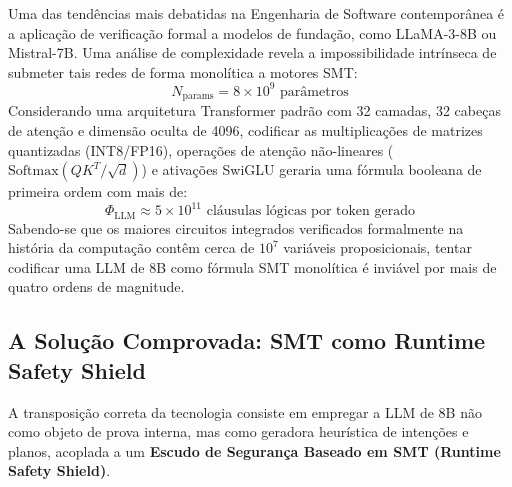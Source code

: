 \documentclass[11pt,a4paper]{article}
\theoremstyle{definition}
\begin{document}
Uma das tendências mais debatidas na Engenharia de Software contemporânea é a aplicação de verificação formal a modelos de fundação, como LLaMA-3-8B ou Mistral-7B. Uma análise de complexidade revela a impossibilidade intrínseca de submeter tais redes de forma monolítica a motores SMT:
\begin{equation}
    N_{\text{params}} = 8 \times 10^9 \text{ parâmetros}
\end{equation}
Considerando uma arquitetura Transformer padrão com 32 camadas, 32 cabeças de atenção e dimensão oculta de 4096, codificar as multiplicações de matrizes quantizadas (INT8/FP16), operações de atenção não-lineares ($\text{Softmax}(QK^T/\sqrt{d})$) e ativações SwiGLU geraria uma fórmula booleana de primeira ordem com mais de:
\begin{equation}
    \Phi_{\text{LLM}} \approx 5 \times 10^{11} \text{ cláusulas lógicas por token gerado}
\end{equation}
Sabendo-se que os maiores circuitos integrados verificados formalmente na história da computação contêm cerca de $10^7$ variáveis proposicionais, tentar codificar uma LLM de 8B como fórmula SMT monolítica é inviável por mais de quatro ordens de magnitude.

\subsection{A Solução Comprovada: SMT como Runtime Safety Shield}

A transposição correta da tecnologia consiste em empregar a LLM de 8B não como objeto de prova interna, mas como geradora heurística de intenções e planos, acoplada a um \textbf{Escudo de Segurança Baseado em SMT (Runtime Safety Shield)}.
\end{document}
